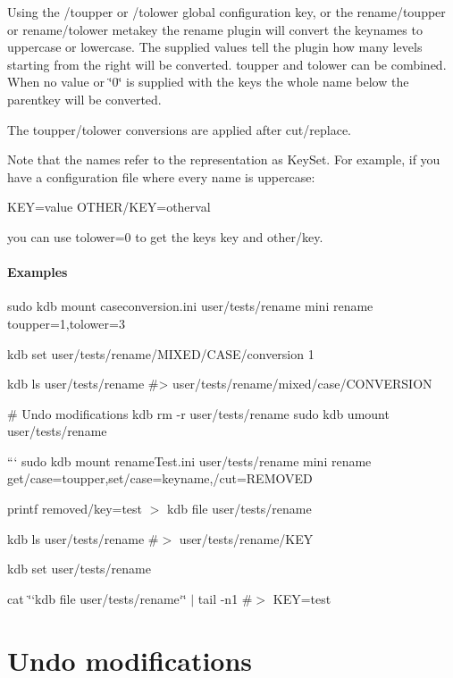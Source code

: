 Using the {\ttfamily /toupper} or {\ttfamily /tolower} global configuration key, or the {\ttfamily rename/toupper} or {\ttfamily rename/tolower} metakey the rename plugin will convert the keynames to uppercase or lowercase. The supplied values tell the plugin how many levels starting from the right will be converted. {\ttfamily toupper} and {\ttfamily tolower} can be combined. When no value or \char`\"{}0\char`\"{} is supplied with the keys the whole name below the parentkey will be converted.

The toupper/tolower conversions are applied after cut/replace.

Note that the names refer to the representation as Key\+Set. For example, if you have a configuration file where every name is uppercase\+:


\begin{DoxyCode}
KEY=value
OTHER/KEY=otherval
\end{DoxyCode}


you can use {\ttfamily tolower=0} to get the keys {\ttfamily key} and {\ttfamily other/key}.

\paragraph*{Examples}


\begin{DoxyCode}
sudo kdb mount caseconversion.ini user/tests/rename mini rename toupper=1,tolower=3

kdb set user/tests/rename/MIXED/CASE/conversion 1

kdb ls user/tests/rename
#> user/tests/rename/mixed/case/CONVERSION

# Undo modifications
kdb rm -r user/tests/rename
sudo kdb umount user/tests/rename
\end{DoxyCode}


``` sudo kdb mount rename\+Test.\+ini user/tests/rename mini rename get/case=toupper,set/case=keyname,/cut=R\+E\+M\+O\+V\+ED

printf \textquotesingle{}removed/key=test\textquotesingle{} $>$ {\ttfamily kdb file user/tests/rename}

kdb ls user/tests/rename \#$>$ user/tests/rename/\+K\+EY

kdb set user/tests/rename

cat \char`\"{}`kdb file user/tests/rename`\char`\"{} $\vert$ tail -\/n1 \#$>$ K\+EY=test

\section*{Undo modifications}


